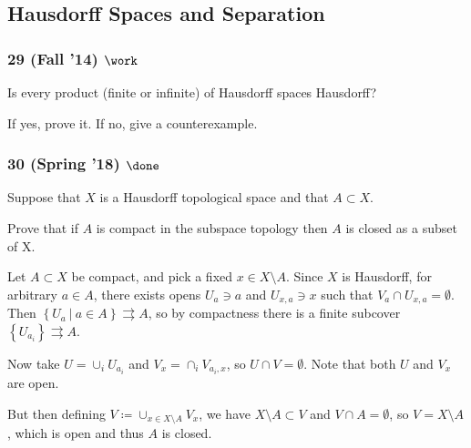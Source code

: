 \hypertarget{hausdorff-spaces-and-separation}{%
\subsection{Hausdorff Spaces and
Separation}\label{hausdorff-spaces-and-separation}}

\hypertarget{fall-14-work-1}{%
\subsubsection{\texorpdfstring{29 (Fall '14)
\(\work\)}{29 (Fall '14) \textbackslash work}}\label{fall-14-work-1}}

Is every product (finite or infinite) of Hausdorff spaces Hausdorff?

If yes, prove it. If no, give a counterexample.

\hypertarget{spring-18-done}{%
\subsubsection{\texorpdfstring{30 (Spring '18)
\(\done\)}{30 (Spring '18) \textbackslash done}}\label{spring-18-done}}

Suppose that \(X\) is a Hausdorff topological space and that
\(A \subset X\).

Prove that if \(A\) is compact in the subspace topology then \(A\) is
closed as a subset of X.

\begin{solution}

\hfill

\begin{concept}

\hfill

\end{concept}

Let \(A \subset X\) be compact, and pick a fixed \(x\in X\setminus A\).
Since \(X\) is Hausdorff, for arbitrary \(a\in A\), there exists opens
\(U_{a} \ni a\) and \(U_{x,a}\ni x\) such that
\(V_{a} \cap U_{x,a} = \emptyset\). Then
\(\left\{{U_{a} {~\mathrel{\Big|}~}a\in A}\right\} \rightrightarrows A\),
so by compactness there is a finite subcover
\(\left\{{U_{a_i}}\right\} \rightrightarrows A\).

Now take \(U = \cup_i U_{a_i}\) and \(V_x = \cap_i V_{a_i, x}\), so
\(U\cap V = \emptyset\). Note that both \(U\) and \(V_x\) are open.

But then defining \(V \coloneqq\cup_{x\in X\setminus A} V_x\), we have
\(X\setminus A \subset V\) and \(V\cap A = \emptyset\), so
\(V = X\setminus A\), which is open and thus \(A\) is closed.

\end{solution}

